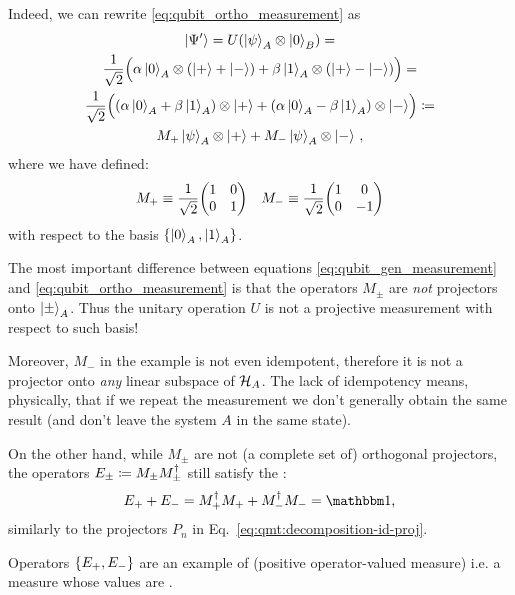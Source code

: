 Indeed, we can rewrite \eqref{eq:qubit_ortho_measurement} as
\begin{multline}\label{eq:qubit_gen_measurement}
  \ket{\Psi'}                                               =
  U( \ket{\psi}_A \otimes \ket{0}_B )                           =         \\
  \frac{1}{\sqrt{2}} \qty\Big(
    \alpha\ket{0}_A \otimes \qty(\ket{+}+\ket{-}) +
    \beta \ket{1}_A \otimes \qty(\ket{+}-\ket{-})
  )                                                         =         \\
  \frac{1}{\sqrt{2}} \qty\Big(
    \qty(\alpha\ket{0}_A + \beta\ket{1}_A) \otimes \ket{+} +
    \qty(\alpha\ket{0}_A - \beta\ket{1}_A) \otimes \ket{-}
  )                                               \coloneqq            \\
  M_+\ket{\psi}_A \otimes \ket{+} + M_-\ket{\psi}_A \otimes \ket{-}
  \,\text{,}
\end{multline}
where we have defined:
\begin{align}\label{eq:qmt:Mpm}
  &
  M_+ \repr \frac{1}{\sqrt{2}}\mqty(\imat{2})
  &
  M_- \repr \frac{1}{\sqrt{2}}\mqty(1& 0\\0& -1)
\end{align}
with respect to the basis $\left\{\ket{0}_A, \ket{1}_A\right\}$.

The most important difference between equations \eqref{eq:qubit_gen_measurement}
and \eqref{eq:qubit_ortho_measurement} is that
the o\-per\-a\-tors $M_{\pm}$ are \emph{not} projectors onto $\ket{\pm}_A$.
Thus the unitary operation $U$ is not a projective measurement
with respect to such basis!

Moreover, $M_-$ in the example is not even idempotent,
therefore it is not a projector onto \emph{any} linear subspace of $\mathcal{H}_A$.
The lack of idempotency means, physically,
that if we repeat the measurement we don't generally
obtain the same result (and don't leave the system $A$ in the same state).

On the other hand,
while $M_{\pm}$ are not (a complete set of) orthogonal projectors,
the operators $E_{\pm} \coloneqq M_{\pm}M_{\pm}^{\dagger}$
still satisfy the
:
\begin{equation}\label{eq:qmt:qubit:povm}
  E_{+} + E_{-} = M_{+}^{\dagger}M_{+} + M_{-}^{\dagger}M_{-} = \idop \text{,}
\end{equation}
similarly to the projectors $P_n$ in Eq.~\eqref{eq:qmt:decomposition-id-proj}.

Operators $\left\{E_{+}, E_{-}\right\}$ are an example of 
(positive operator-valued measure) i.e. a measure whose
values are .

